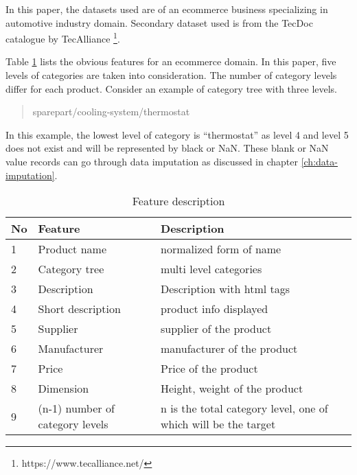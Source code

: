 In this paper, the datasets used are of an ecommerce business specializing in automotive industry domain. Secondary dataset used is from the TecDoc catalogue by TecAlliance \footnote{https://www.tecalliance.net/}. 

Table \ref{table:feature_decription} lists the obvious features for an ecommerce domain. In this paper, five levels of categories are taken into consideration. The number of category levels differ for each product. Consider an example of category tree with three levels. 

\begin{quote} 
\centering 
sparepart/cooling-system/thermostat
\end{quote}
In this example, the lowest level of category is ``thermostat'' as level 4 and level 5 does not exist and will be represented by black or NaN. These blank or NaN value records can go through data imputation as discussed in chapter \ref{ch:data-imputation}.



\begin{table}[h]
      \centering
      \caption{Feature description}
      \label{table:feature_decription}
      \begin{tabular}{ lll }
            \toprule
            
            \textbf{No}& \textbf{Feature} & \textbf{Description}\\
            \midrule
            1&Product name & normalized form of name\\
            2&Category tree & multi level categories\\
            3&Description & Description with html tags\\         
            4&Short description  & product info displayed\\
            5&Supplier  &  supplier of the product\\
            6&Manufacturer  &  manufacturer of the product\\           
            7&Price  &  Price of the product\\
            8&Dimension  & Height, weight of the product\\
            9&(n-1) number of  category levels   &  n is the total category level, one of which will be the target\\
           
            \bottomrule
            \end{tabular}


\end{table}

